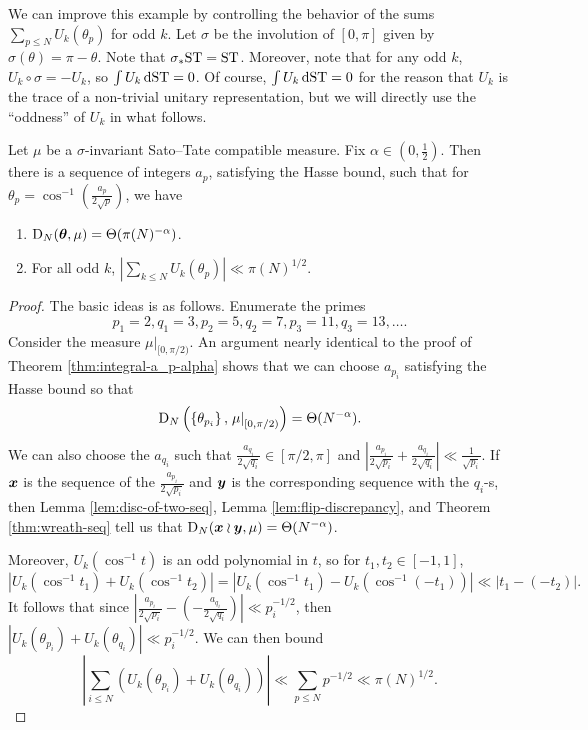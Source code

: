 We can improve this example by controlling the behavior of the sums 
$\sum_{p\leqslant N} U_k(\theta_p)$ for odd $k$. Let $\sigma$ be 
the involution of $[0,\pi]$ given by $\sigma(\theta) = \pi-\theta$. Note that 
$\sigma_\ast \mathrm{ST} = \mathrm{ST}$. Moreover, note that for any odd $k$, 
$U_k\circ\sigma = - U_k$, so $\int U_k\, \mathrm{d}\mathrm{ST} = 0$. Of course, 
$\int U_k \,\mathrm{d}\mathrm{ST} = 0$ for the reason that $U_k$ is the trace of a 
non-trivial unitary representation, but we will directly use the ``oddness'' 
of $U_k$ in what follows.

\begin{theorem}\label{thm:int-flip-seq}
Let $\mu$ be a $\sigma$-invariant Sato--Tate compatible measure. Fix 
$\alpha\in \left(0,\frac 1 2\right)$. Then there is a sequence of integers 
$a_p$, satisfying the Hasse bound, such that for 
$\theta_p =\cos^{-1}\left( \frac{a_p}{2\sqrt p}\right)$, we have
\begin{enumerate}
\item
$\operatorname{D}_N({\boldsymbol\theta},\mu) = \Theta(\pi(N)^{-\alpha})$. 

\item
For all odd $k$, 
$\left| \sum_{k\leqslant N} U_k(\theta_p)\right| \ll \pi(N)^{1/2}$. 
\end{enumerate}
\end{theorem}
\begin{proof}
The basic ideas is as follows. Enumerate the primes 
\[
	p_1 = 2, q_1 = 3, p_2 = 5, q_2 = 7, p_3 = 11, q_3 = 13, \dots .
\]
Consider the measure $\left.\mu\right|_{[0,\pi/2)}$. An argument 
nearly identical to the proof of Theorem \ref{thm:integral-a_p-alpha} shows 
that we can choose $a_{p_i}$ satisfying the Hasse bound so that 
\[
	\operatorname{D}_N\left( \left\{\theta_{p_i}\right\},\left.\mu\right|_{[0,\pi/2)}\right) = \Theta(N^{-\alpha}) .
\]
We can also choose the $a_{q_i}$ such that 
$\frac{a_{q_i}}{2\sqrt{q_i}}\in [\pi/2,\pi]$ and 
$\left| \frac{a_{p_i}}{2\sqrt{p_i}} + \frac{a_{q_i}}{2\sqrt{q_i}}\right| \ll \frac{1}{\sqrt{p_i}}$. 
If ${\boldsymbol x}$ is the sequence of the $\frac{a_{p_i}}{2\sqrt{p_i}}$ and ${\boldsymbol y}$ is 
the corresponding sequence with the $q_i$-s, then Lemma 
\ref{lem:disc-of-two-seq}, Lemma \ref{lem:flip-discrepancy}, and Theorem 
\ref{thm:wreath-seq} tell us that $\operatorname{D}_N({\boldsymbol x}\wr{\boldsymbol y},\mu) = \Theta(N^{-\alpha})$. 

Moreover, $U_k(\cos^{-1} t)$ is an odd polynomial in $t$, so for 
$t_1,t_2\in [-1,1]$, 
\[
	|U_k(\cos^{-1} t_1) + U_k(\cos^{-1} t_2)| = |U_k(\cos^{-1} t_1) - U_k(\cos^{-1}(-t_1))| \ll |t_1 - (-t_2)|.
\]
It follows that since 
$\left|\frac{a_{p_i}}{2\sqrt{p_i}} - \left(- \frac{a_{q_i}}{2\sqrt{q_i}}\right)\right| \ll p_i^{-1/2}$, 
then $|U_k(\theta_{p_i}) + U_k(\theta_{q_i})|\ll p_i^{-1/2}$. 
We can then bound 
\[
	\left| \sum_{i\leqslant N} \left(U_k(\theta_{p_i}) + U_k(\theta_{q_i})\right)\right| \ll \sum_{p\leqslant N} p^{-1/2} \ll \pi(N)^{1/2} .
\]
\end{proof}

